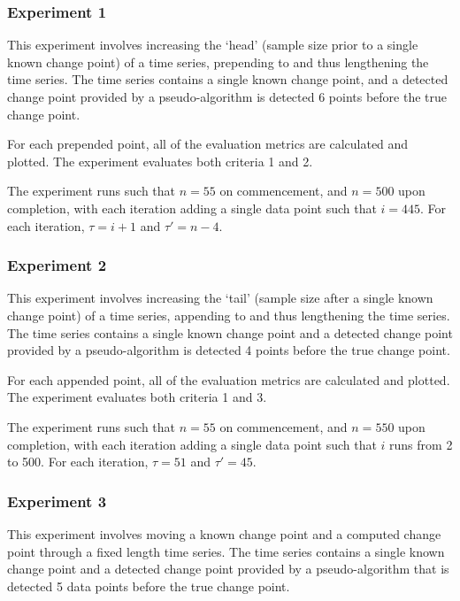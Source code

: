 \documentclass{uvamscse}	%
\begin{document}
\subsubsection{Experiment 1}

This experiment involves increasing the `head' (sample size prior to a single known change point) of a time series, prepending to and thus lengthening the time series. The time series contains a single known change point, and a detected change point provided by a pseudo-algorithm is detected 6 points before the true change point.

For each prepended point, all of the evaluation metrics are calculated and plotted. The experiment evaluates both criteria 1 and 2.

The experiment runs such that $n = 55$ on commencement, and $n = 500$ upon completion, with each iteration adding a single data point such that $i = 445$. For each iteration, $\tau = i + 1$ and $\tau' = n - 4$.


\subsubsection{Experiment 2}

This experiment involves increasing the `tail' (sample size after a single known change point) of a time series, appending to and thus lengthening the time series. The time series contains a single known change point and a detected change point provided by a pseudo-algorithm is detected 4 points before the true change point.

For each appended point, all of the evaluation metrics are calculated and plotted. The experiment evaluates both criteria 1 and 3.

The experiment runs such that $n=55$ on commencement, and $n=550$ upon completion, with each iteration adding a single data point such that $i$ runs from 2 to 500. For each iteration, $\tau = 51$ and $\tau' = 45$.


\subsubsection{Experiment 3}

This experiment involves moving a known change point and a computed change point through a fixed length time series. The time series contains a single known change point and a detected change point provided by a pseudo-algorithm that is detected 5 data points before the true change point.
\end{document}
